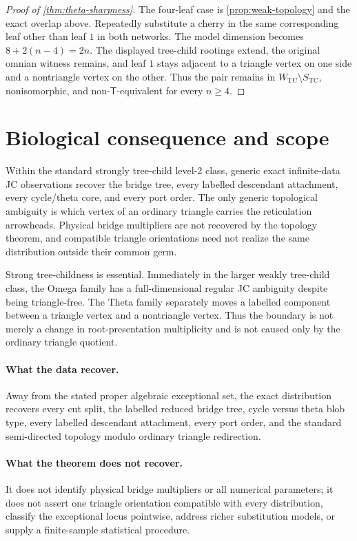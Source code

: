 \documentclass[11pt]{article}
\theoremstyle{remark}
\newcommand{\TCw}{W_{\mathrm{TC}}}
\newcommand{\TCs}{S_{\mathrm{TC}}}
\newcommand{\Tmove}{\mathsf T}
\begin{document}
\begin{proof}[Proof of \cref{thm:theta-sharpness}]
The four-leaf case is \cref{prop:weak-topology} and the exact overlap above.
Repeatedly substitute a cherry in the same corresponding leaf other than
leaf $1$ in both networks.  The model dimension becomes
$8+2(n-4)=2n$.  The displayed
tree-child rootings extend, the original omnian witness remains, and leaf
$1$ stays adjacent to a triangle vertex on one side and a nontriangle vertex
on the other.  Thus the pair remains in $\TCw\setminus\TCs$, nonisomorphic,
and non-$\Tmove$-equivalent for every $n\ge4$.
\end{proof}

\section{Biological consequence and scope}

Within the standard strongly tree-child level-2 class, generic exact
infinite-data JC observations recover the bridge tree, every labelled descendant
attachment, every cycle/theta core, and every port order.  The only generic
topological ambiguity is which vertex of an ordinary triangle carries the
reticulation arrowheads.  Physical bridge multipliers are not recovered by
the topology theorem, and compatible triangle orientations need not realize
the same distribution outside their common germ.

Strong tree-childness is essential.  Immediately in the larger weakly
tree-child class, the Omega family has a full-dimensional regular JC
ambiguity despite being triangle-free.  The Theta family separately moves a
labelled component between a triangle vertex and a nontriangle vertex.  Thus
the boundary is not merely a change in root-presentation multiplicity and is
not caused only by the ordinary triangle quotient.

\paragraph{What the data recover.}
Away from the stated proper algebraic exceptional set, the exact distribution
recovers every cut split, the labelled reduced bridge tree, cycle versus theta
blob type, every labelled descendant attachment, every port order, and the
standard semi-directed topology modulo ordinary triangle redirection.

\paragraph{What the theorem does not recover.}
It does not identify physical bridge multipliers or all numerical parameters;
it does not assert one triangle orientation compatible with every
distribution, classify the exceptional locus pointwise, address richer
substitution models, or supply a finite-sample statistical procedure.
\end{document}
